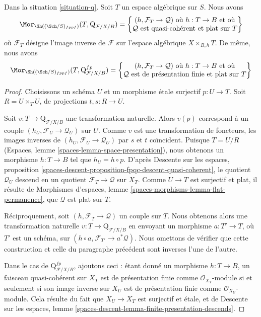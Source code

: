 \begin{lemma}
\label{lemma-extend-q-to-spaces}
Dans la situation \ref{situation-q}. Soit $T$ un espace algébrique sur $S$.
Nous avons
$$
\Mor_{\Sh((\Sch/S)_{fppf})}(T,  \text{Q}_{\mathcal{F}/X/B}) =
\left\{
\begin{matrix}
(h, \mathcal{F}_T \to \mathcal{Q}) \text{ où }
h : T \to B \text{ et où}\\
\mathcal{Q}\text{ est quasi-cohérent et plat sur }T
\end{matrix}
\right\}
$$
où $\mathcal{F}_T$ désigne l'image inverse de $\mathcal{F}$ sur l'espace
algébrique $X \times_{B, h} T$. De même, nous avons
$$
\Mor_{\Sh((\Sch/S)_{fppf})}(T,  \text{Q}^{fp}_{\mathcal{F}/X/B}) =
\left\{
\begin{matrix}
(h, \mathcal{F}_T \to \mathcal{Q}) \text{ où }
h : T \to B \text{ et où}\\
\mathcal{Q}\text{ est de présentation finie et plat sur }T
\end{matrix}
\right\}
$$
\end{lemma}

\begin{proof}
Choisissons un schéma $U$ et un morphisme étale surjectif $p : U \to T$.
Soit $R = U \times_T U$, de projections $t, s : R \to U$.

\medskip\noindent
Soit $v : T \to \text{Q}_{\mathcal{F}/X/B}$ une transformation naturelle.
Alors $v(p)$ correspond à un couple
$(h_U, \mathcal{F}_U \to \mathcal{Q}_U)$ sur $U$. Comme $v$ est une
transformation de foncteurs, les images inverses de
$(h_U, \mathcal{F}_U \to \mathcal{Q}_U)$ par $s$ et $t$ coïncident. Puisque
$T = U/R$ (Espaces, lemme \ref{spaces-lemma-space-presentation}), nous
obtenons un morphisme $h : T \to B$ tel que $h_U = h \circ p$. D'après
Descente sur les espaces, proposition
\ref{spaces-descent-proposition-fpqc-descent-quasi-coherent}, le quotient
$\mathcal{Q}_U$ descend en un quotient $\mathcal{F}_T \to \mathcal{Q}$ sur
$X_T$. Comme $U \to T$ est surjectif et plat, il résulte de Morphismes
d'espaces, lemme \ref{spaces-morphisms-lemma-flat-permanence}, que
$\mathcal{Q}$ est plat sur $T$.

\medskip\noindent
Réciproquement, soit $(h, \mathcal{F}_T \to \mathcal{Q})$ un couple sur $T$.
Nous obtenons alors une transformation naturelle
$v : T \to \text{Q}_{\mathcal{F}/X/B}$ en envoyant un morphisme
$a : T' \to T$, où $T'$ est un schéma, sur
$(h \circ a, \mathcal{F}_{T'} \to a^*\mathcal{Q})$. Nous omettons de vérifier
que cette construction et celle du paragraphe précédent sont inverses l'une
de l'autre.

\medskip\noindent
Dans le cas de $\text{Q}^{fp}_{\mathcal{F}/X/B}$, ajoutons ceci : étant donné
un morphisme $h : T \to B$, un faisceau quasi-cohérent sur $X_T$ est de
présentation finie comme $\mathcal{O}_{X_T}$-module si et seulement si son
image inverse sur $X_U$ est de présentation finie comme
$\mathcal{O}_{X_U}$-module. Cela résulte du fait que $X_U \to X_T$ est
surjectif et étale, et de Descente sur les espaces, lemme
\ref{spaces-descent-lemma-finite-presentation-descends}.
\end{proof}

